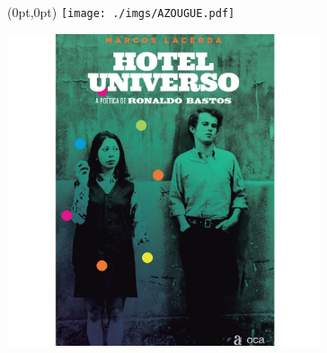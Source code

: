 \pagestyle{azougue}
\label{azougue}


\begin{textblock*}{5.625in}(0pt,0pt)%
\vspace*{-2.35cm}
\hspace*{-1.65cm}\texttt{[image: ./imgs/AZOUGUE.pdf]}
\end{textblock*}

\pagebreak

%
%
%
%
%
%
%

\hspace{.5cm}

\begin{center}
\hspace*{.5cm}\includegraphics[width=92mm]{./grid/hotel.jpg}
\end{center}

